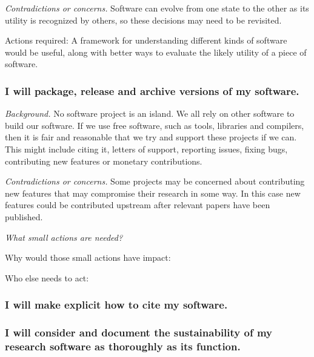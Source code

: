\documentclass[a4paper,UKenglish]{dagman}
\renewcommand{\paragraph}[1]{\subsubsection*{#1}\xspace}
\begin{document}
\emph{Contradictions or concerns.} Software can evolve from one state to the other as its utility is recognized by others, so these decisions may need to be revisited. 

Actions required: A framework for understanding different kinds of software would be useful, along with better ways to evaluate the likely utility of a piece of software. 


\paragraph{I will package, release and archive versions of my software.}




\emph{Background.}
No software project is an island. We all rely on other software to build our software. If we use free software, such as tools, libraries and compilers, then it is fair and reasonable that we try and support these projects if we can. This might include citing it, letters of support, reporting issues, fixing bugs, contributing new features or monetary contributions.

\emph{Contradictions or concerns.}
Some projects may be concerned about contributing new features that may compromise their research in some way. In this case new features could be contributed upstream after relevant papers have been published.

\emph{What small actions are needed?}



Why would those small actions have impact:



Who else needs to act:




\paragraph{I will make explicit how to cite my software.}


\paragraph{I will consider and document the sustainability of my research software as thoroughly as its function.}


\end{document}
